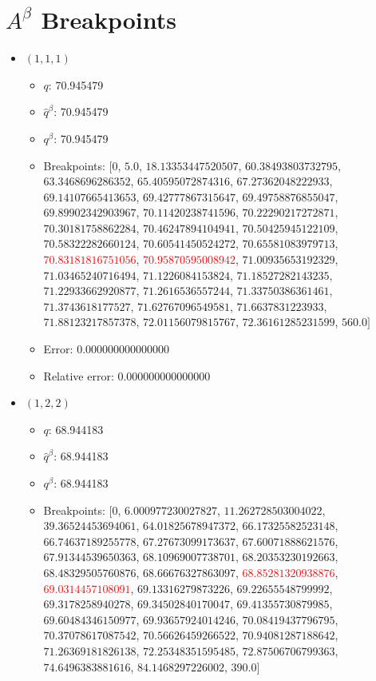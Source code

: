 \documentclass{article}%
\begin{document}
\section{$A^\beta$ Breakpoints}%
\thispagestyle{plain}%
\begin{itemize}%
	\item $(1, 1, 1)$%
	\begin{itemize}%
		\item $q$: 70.945479%
		\item $\hat{q}^\beta$: 70.945479%
		\item $q^\beta$: 70.945479%
		\item Breakpoints: $[$$0$, $5.0$, $18.13353447520507$, $60.38493803732795$, $63.3468696286352$, $65.40595072874316$, $67.27362048222933$, $69.14107665413653$, $69.42777867315647$, $69.49758876855047$, $69.89902342903967$, $70.11420238741596$, $70.22290217272871$, $70.30181758862284$, $70.46247894104941$, $70.50425945122109$, $70.58322282660124$, $70.60541450524272$, $70.65581083979713$, \textcolor{red}{$70.83181816751056$}, \textcolor{red}{$70.95870595008942$}, $71.00935653192329$, $71.03465240716494$, $71.1226084153824$, $71.18527282143235$, $71.22933662920877$, $71.2616536557244$, $71.33750386361461$, $71.3743618177527$, $71.62767096549581$, $71.6637831223933$, $71.88123217857378$, $72.01156079815767$, $72.36161285231599$, $560.0$$]$%
		\item Error: 0.000000000000000%
		\item Relative error: 0.000000000000000%
	\end{itemize}%
	\item $(1, 2, 2)$%
	\begin{itemize}%
		\item $q$: 68.944183%
		\item $\hat{q}^\beta$: 68.944183%
		\item $q^\beta$: 68.944183%
		\item Breakpoints: $[$$0$, $6.000977230027827$, $11.262728503004022$, $39.36524453694061$, $64.01825678947372$, $66.17325582523148$, $66.74637189255778$, $67.27673099173637$, $67.60071888621576$, $67.91344539650363$, $68.10969007738701$, $68.20353230192663$, $68.48329505760876$, $68.66676327863097$, \textcolor{red}{$68.85281320938876$}, \textcolor{red}{$69.0314457108091$}, $69.13316279873226$, $69.22655548799992$, $69.3178258940278$, $69.34502840170047$, $69.41355730879985$, $69.60484346150977$, $69.93657924014246$, $70.08419437796795$, $70.37078617087542$, $70.56626459266522$, $70.94081287188642$, $71.26369181826138$, $72.25348351595485$, $72.87506706799363$, $74.6496383881616$, $84.1468297226002$, $390.0$$]$%

\end{itemize}
\end{itemize}
\end{document}
